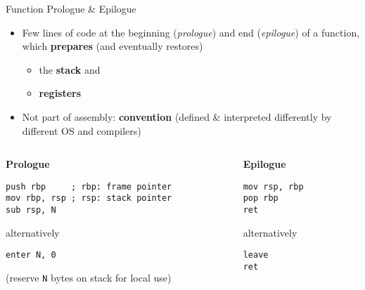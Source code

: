 \begin{frame}
    \centering
    \scalebox{3}{Reading x86-64 Assembly}

    \scalebox{2}{\ldots for fun and profit}
\end{frame}

\begin{frame}[fragile]{Function Prologue \& Epilogue}
    \begin{itemize}
        \item Few lines of code at the beginning (\textit{prologue}) and end (\textit{epilogue}) of a function, which \textbf{prepares} (and eventually restores)
        \begin{itemize}
            \item the \textbf{stack} and 
            \item \textbf{registers}
        \end{itemize}
        \item Not part of assembly: \textbf{convention} (defined \& interpreted differently by different OS and compilers)
    \end{itemize}

    \begin{columns}[t]
        \begin{column}{.45\textwidth}
            \textbf{Prologue}
            \begin{lstlisting}[language={}]
push rbp     ; rbp: frame pointer
mov rbp, rsp ; rsp: stack pointer
sub rsp, N
            \end{lstlisting}
            alternatively
            \begin{lstlisting}[language={}]
enter N, 0
            \end{lstlisting}
            (reserve \texttt{N} bytes on stack for local use)
        \end{column}
        \begin{column}{.45\textwidth}
            \textbf{Epilogue}
            \begin{lstlisting}[language={}]
mov rsp, rbp
pop rbp
ret
            \end{lstlisting}
            alternatively
            \begin{lstlisting}[language={}]
leave
ret
            \end{lstlisting}
        \end{column}
    \end{columns}
\end{frame}

